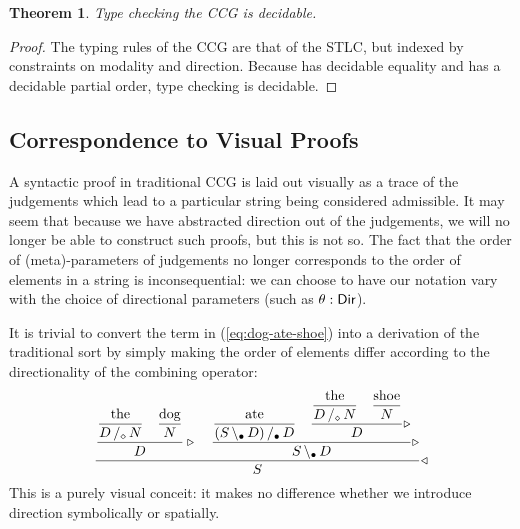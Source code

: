 \documentclass{amsart}
\newtheorem{theorem}{Theorem}[section]
\begin{document}
\begin{theorem}\label{thm:decidable-ccg}
  Type checking the CCG is decidable.
\end{theorem}
\begin{proof}
  The typing rules of the CCG are that of the STLC, but indexed by
  constraints on modality and direction. Because  has decidable
  equality and  has a decidable partial order, type checking is
  decidable.
\end{proof}

\subsection{Correspondence to Visual Proofs}

A syntactic proof in traditional CCG is laid out visually as a trace of
the judgements which lead to a particular string being considered
admissible. It may seem that because we have abstracted direction out of
the judgements, we will no longer be able to construct such proofs, but
this is not so. The fact that the order of (meta)-parameters of
judgements no longer corresponds to the order of elements in a string is
inconsequential: we can choose to have our notation vary with the choice
of directional parameters (such as $\theta:\mathsf{Dir}$).

It is trivial to convert the term in (\ref{eq:dog-ate-shoe}) into a
derivation of the traditional sort by simply making the order of
elements differ according to the directionality of the combining
operator:
\begin{equation}
  \dfrac{
    \dfrac{
      \dfrac{\text{the}}{\rarrty D|[\con\diamond]N}
      \quad
      \dfrac{\text{dog}}{N}
    }{D}\triangleright
    \quad
    \dfrac{
      \dfrac{\text{ate}}{\rarrty {(\larrty S|[\con\bullet]D)}|[\con\bullet]D}
      \quad
      \dfrac{
        \dfrac{\text{the}}{\rarrty D|[\con\diamond]N}
        \quad
        \dfrac{\text{shoe}}{N}
      }{D}\triangleright
    }{\larrty S|[\con\bullet]D}\triangleright
  }{S}\triangleleft
\end{equation}
This is a purely visual conceit: it makes no difference whether we
introduce direction symbolically or spatially.
\end{document}
